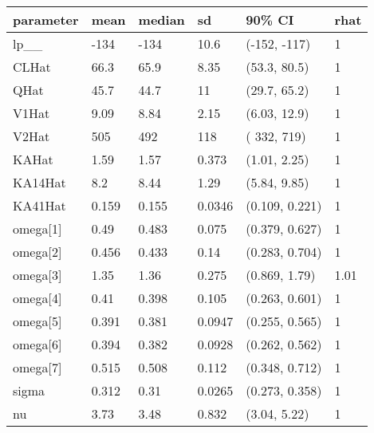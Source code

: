 
\begin{tabular}{l|l|l|l|l|l}
\hline
parameter & mean & median & sd & 90\% CI & rhat\\
\hline
lp\_\_ & -134 & -134 & 10.6 & (-152, -117) & 1\\
\hline
CLHat & 66.3 & 65.9 & 8.35 & (53.3, 80.5) & 1\\
\hline
QHat & 45.7 & 44.7 & 11 & (29.7, 65.2) & 1\\
\hline
V1Hat & 9.09 & 8.84 & 2.15 & (6.03, 12.9) & 1\\
\hline
V2Hat & 505 & 492 & 118 & ( 332,  719) & 1\\
\hline
KAHat & 1.59 & 1.57 & 0.373 & (1.01, 2.25) & 1\\
\hline
KA14Hat & 8.2 & 8.44 & 1.29 & (5.84, 9.85) & 1\\
\hline
KA41Hat & 0.159 & 0.155 & 0.0346 & (0.109, 0.221) & 1\\
\hline
omega[1] & 0.49 & 0.483 & 0.075 & (0.379, 0.627) & 1\\
\hline
omega[2] & 0.456 & 0.433 & 0.14 & (0.283, 0.704) & 1\\
\hline
omega[3] & 1.35 & 1.36 & 0.275 & (0.869, 1.79) & 1.01\\
\hline
omega[4] & 0.41 & 0.398 & 0.105 & (0.263, 0.601) & 1\\
\hline
omega[5] & 0.391 & 0.381 & 0.0947 & (0.255, 0.565) & 1\\
\hline
omega[6] & 0.394 & 0.382 & 0.0928 & (0.262, 0.562) & 1\\
\hline
omega[7] & 0.515 & 0.508 & 0.112 & (0.348, 0.712) & 1\\
\hline
sigma & 0.312 & 0.31 & 0.0265 & (0.273, 0.358) & 1\\
\hline
nu & 3.73 & 3.48 & 0.832 & (3.04, 5.22) & 1\\
\hline
\end{tabular}
